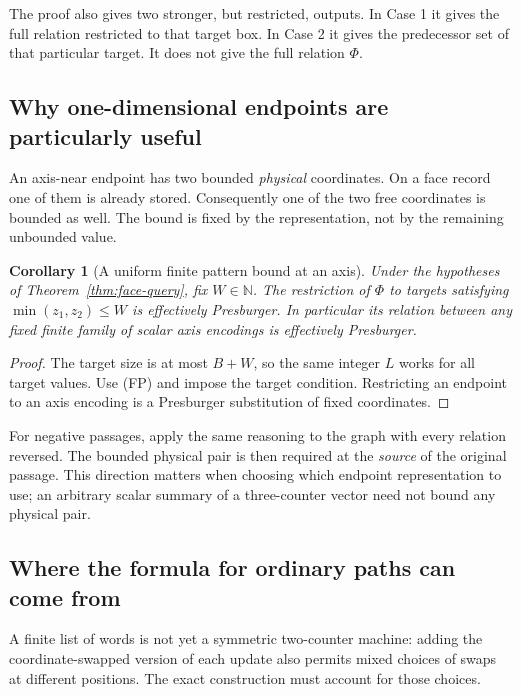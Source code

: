 \documentclass[11pt,a4paper]{article}
\newtheorem{corollary}[theorem]{Corollary}
\theoremstyle{definition}
\theoremstyle{remark}
\newcommand{\N}{\mathbb N}
\begin{document}
The proof also gives two stronger, but restricted, outputs.
In Case 1 it gives the full relation restricted to that target box.
In Case 2 it gives the predecessor set of that particular target.
It does not give the full relation \(\Phi\).

\subsection{Why one-dimensional endpoints are particularly useful}

An axis-near endpoint has two bounded \emph{physical} coordinates.
On a face record one of them is already stored. Consequently one of
the two free coordinates is bounded as well. The bound is fixed by the
representation, not by the remaining unbounded value.

\begin{corollary}[A uniform finite pattern bound at an axis]
\label{cor:axis-patterns}
Under the hypotheses of Theorem~\ref{thm:face-query}, fix \(W\in\N\).
The restriction of \(\Phi\) to targets satisfying
\(\min(z_1,z_2)\le W\) is effectively Presburger.
In particular its relation between any fixed finite family of scalar
axis encodings is effectively Presburger.
\end{corollary}
\begin{proof}
The target size is at most \(B+W\), so the same integer \(L\) works
for all target values. Use (FP) and impose the target condition.
Restricting an endpoint to an axis encoding is a Presburger
substitution of fixed coordinates.
\end{proof}

For negative passages, apply the same reasoning to the graph with
every relation reversed. The bounded physical pair is then required
at the \emph{source} of the original passage.
This direction matters when choosing which endpoint representation to
use; an arbitrary scalar summary of a three-counter vector need not
bound any physical pair.

\subsection{Where the formula for ordinary paths can come from}

A finite list of words is not yet a symmetric two-counter machine:
adding the coordinate-swapped version of each update also permits
mixed choices of swaps at different positions. The exact construction
must account for those choices.
\end{document}
